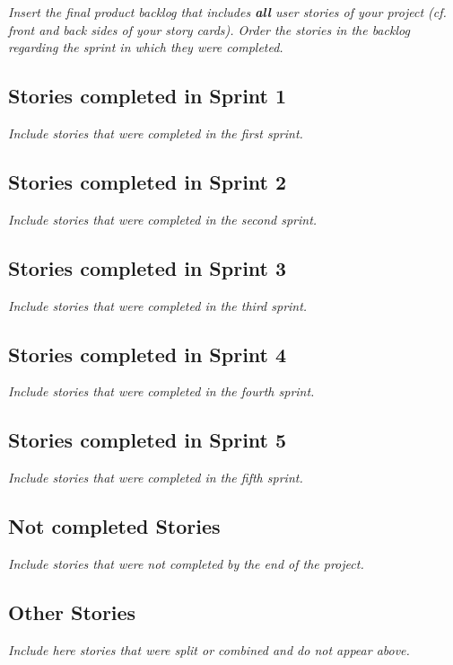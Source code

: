 \flushleft
\emph{Insert the final product backlog that includes \textbf{all} user stories 
of your project (cf. front and back sides of your story cards). Order the 
stories in the backlog regarding the sprint in which they were completed.}

\subsection*{Stories completed in Sprint 1}

\emph{Include stories that were completed in the first sprint.}

\subsection*{Stories completed in Sprint 2}
\emph{Include stories that were completed in the second sprint.}

\subsection*{Stories completed in Sprint 3}
\emph{Include stories that were completed in the third sprint.}

\subsection*{Stories completed in Sprint 4}
\emph{Include stories that were completed in the fourth sprint.}

\subsection*{Stories completed in Sprint 5}
\emph{Include stories that were completed in the fifth sprint.}

\subsection*{Not completed Stories}
\emph{Include stories that were not completed by the end of the project.}

\subsection*{Other Stories}
\emph{Include here stories that were split or combined and do not appear above.}
